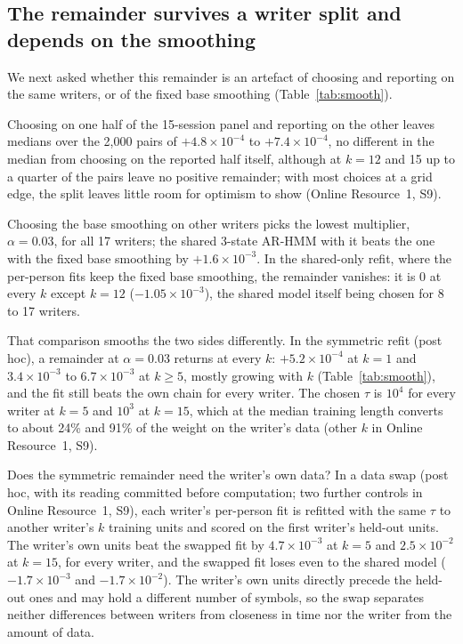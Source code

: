 \documentclass[pdflatex,sn-basic]{sn-jnl}
\newcommand{\Sref}[1]{Online Resource~1, S#1}
\newcommand{\arthree}{\mbox{3-state} \mbox{AR-HMM}}
\begin{document}
\subsection{The remainder survives a writer split and depends on the smoothing}\label{sec:res-smooth}
We next asked whether this remainder is an artefact of choosing and reporting on the same writers, or of the fixed base smoothing (Table~\ref{tab:smooth}).

Choosing on one half of the 15-session panel and reporting on the other leaves medians over the 2,000 pairs of $+4.8\times10^{-4}$ to $+7.4\times10^{-4}$, no different in the median from choosing on the reported half itself, although at $k=12$ and 15 up to a quarter of the pairs leave no positive remainder; with most choices at a grid edge, the split leaves little room for optimism to show (\Sref{9}).

Choosing the base smoothing on other writers picks the lowest multiplier, $\alpha=0.03$, for all 17 writers; the shared \arthree{} with it beats the one with the fixed base smoothing by $+1.6\times10^{-3}$. In the shared-only refit, where the per-person fits keep the fixed base smoothing, the remainder vanishes: it is 0 at every $k$ except $k=12$ ($-1.05\times10^{-3}$), the shared model itself being chosen for 8 to 17 writers.

That comparison smooths the two sides differently. In the symmetric refit (post hoc), a remainder at $\alpha=0.03$ returns at every $k$: $+5.2\times10^{-4}$ at $k=1$ and $3.4\times10^{-3}$ to $6.7\times10^{-3}$ at $k\ge5$, mostly growing with $k$ (Table~\ref{tab:smooth}), and the fit still beats the own chain for every writer. The chosen $\tau$ is $10^4$ for every writer at $k=5$ and $10^3$ at $k=15$, which at the median training length converts to about 24\% and 91\% of the weight on the writer's data (other $k$ in \Sref{9}).

Does the symmetric remainder need the writer's own data? In a data swap (post hoc, with its reading committed before computation; two further controls in \Sref{9}), each writer's per-person fit is refitted with the same $\tau$ to another writer's $k$ training units and scored on the first writer's held-out units. The writer's own units beat the swapped fit by $4.7\times10^{-3}$ at $k=5$ and $2.5\times10^{-2}$ at $k=15$, for every writer, and the swapped fit loses even to the shared model ($-1.7\times10^{-3}$ and $-1.7\times10^{-2}$). The writer's own units directly precede the held-out ones and may hold a different number of symbols, so the swap separates neither differences between writers from closeness in time nor the writer from the amount of data.
\end{document}
